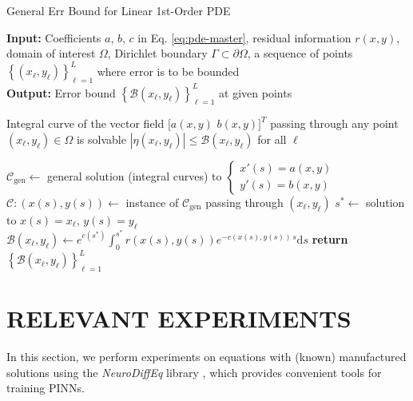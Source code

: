 \documentclass[accepted]{uai2023}
\newcommand{\Err}{\eta}
\newcommand{\Bound}{\mathcal{B}}
\begin{document}
    \begin{algorithm}
        \small
        \caption{General Err Bound for Linear 1st-Order PDE}\label{alg:linear-first-order-pde-general}
        \textbf{Input:} Coefficients $a$, $b$, $c$ in Eq. \ref{eq:pde-master}, residual information $r(x, y)$, domain of interest $\Omega$, Dirichlet boundary $\Gamma\subset \partial \Omega$, a sequence of points $\left\{(x_\ell, y_\ell)\right\}_{\ell=1}^{L}$ where error is to be bounded\\
        \textbf{Output:} Error bound $\left\{\Bound(x_\ell, y_\ell)\right\}_{\ell=1}^{L}$ at given points
        \begin{algorithmic}
            \Require Integral curve of the vector field $\big[a(x, y)\,\, b(x, y)\big]^T$ passing through any point $(x_\ell, y_\ell) \in \Omega$ is solvable
            \Ensure $|\Err(x_\ell, y_\ell)| \leq \Bound(x_\ell, y_\ell)$ for all $\ell$

            \State $\mathcal{C}_{\text{gen}} \gets $ general solution (integral curves) to {\smaller $\begin{cases}x'(s) = a(x, y) \\ y'(s) = b(x, y)\end{cases}$}
            \vspace{-1em} %
                \State $\mathcal{C}:(x(s), y(s))\gets$ instance of $\mathcal{C}_{\text{gen}}$ passing through $(x_\ell, y_\ell)$
                \State $s^* \gets$ solution to $x(s) = x_\ell,\, y(s)=y_\ell$
                \vspace{-0.25em}
                \State $\displaystyle \Bound(x_\ell, y_\ell) \gets e^{c(s^*)}\int_{0}^{s^*}r(x(s), y(s)) e^{-c(x(s),y(s))\,s}\mathrm{d}s$ 
                \vspace{-0.5em}
            \EndFor
            \State \textbf{return} $\left\{\Bound(x_\ell, y_\ell)\right\}_{\ell=1}^{L}$
        \end{algorithmic}
    \end{algorithm}

\section{RELEVANT EXPERIMENTS}\label{section:experiments}
    In this section, we perform experiments on equations with (known) manufactured solutions using the \textit{NeuroDiffEq} library \citep{chen2020neurodiffeq}, which provides convenient tools for training PINNs. 
\end{document}
